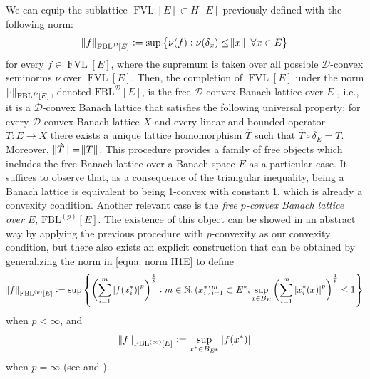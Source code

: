 \documentclass[12pt,leqno]{amsart}
\numberwithin{equation}{section} %
\theoremstyle{definition}
\numberwithin{equation}{section}
\newcommand{\N}{\mathbb{N}}
\newcommand{\Dcal}{\mathcal{D}}
\newcommand{\fbl}{\mathrm{FBL}}
\newcommand{\fbp}{{\mathrm{FBL}}^{(p)}}
\DeclareMathOperator{\FVL}{FVL}
\DeclareMathOperator{\FBLi}{FBL^{(\infty)}}
\begin{document}
We can equip the sublattice $\FVL[E]\subset H[E]$ previously defined with the following norm:
\begin{equation*}
    \norm{f}_{\fbl^{\Dcal}[E]}:=\sup\cbr{\nu(f): \nu(\delta_x)\leq \norm{x}\,\,\forall x\in E}
\end{equation*}
for every $f\in \FVL[E]$, where the supremum is taken over all possible $\Dcal$-convex seminorms $\nu$ over $\FVL[E]$. Then, the completion of $\FVL[E]$ under the norm $\norm{\cdot}_{\fbl^{\Dcal}[E]}$, denoted $\fbl^{\Dcal}[E]$, is the free $\Dcal$-convex Banach lattice over $E$ \cite[Theorem 3.3]{JLTTT}, i.e., it is a $\Dcal$-convex Banach lattice that satisfies the following universal property: for every $\Dcal$-convex Banach lattice $X$ and every linear and bounded operator $T:E\rightarrow X$ there exists a unique lattice homomorphism $\hat T$ such that $\hat{T}\circ \delta_E=T$. Moreover, $\norm[0]{\hat{T}}=\norm{T}$. This procedure provides a family of free objects which includes the free Banach lattice over a Banach space $E$ as a particular case. It suffices to observe that, as a consequence of the triangular inequality, being a Banach lattice is equivalent to being 1-convex with constant 1, which is already a convexity condition. Another relevant case is the \textit{free $p$-convex Banach lattice over $E$}, $\fbp[E]$. The existence of this object can be showed in an abstract way by applying the previous procedure with $p$-convexity as our convexity condition, but there also exists an explicit construction that can be obtained by generalizing the norm in \eqref{equa: norm H1E} to define
\begin{equation*}
	\norm{f}_{\fbp[E]}:=\sup \cbr{\intoo[3]{\sum_{i=1}^m \abs[0]{f(x_i^*)}^p}^{\frac{1}{p}}: m\in \N, (x_i^*)_{i=1}^m\subset E^*, \sup_{x\in B_E} \intoo[3]{\sum_{i=1}^m \abs[0]{x_i^*(x)}^p}^{\frac{1}{p}}\leq 1}
\end{equation*}
when $p<\infty$, and
\begin{equation*}
	\norm{f}_{\FBLi[E]}:= \sup_{x^*\in B_{E^*}} \abs[0]{f(x^*)}
\end{equation*}
when $p=\infty$ (see \cite[Section 6]{JLTTT} and \cite[Section 2]{OTTT}). \\
\end{document}
